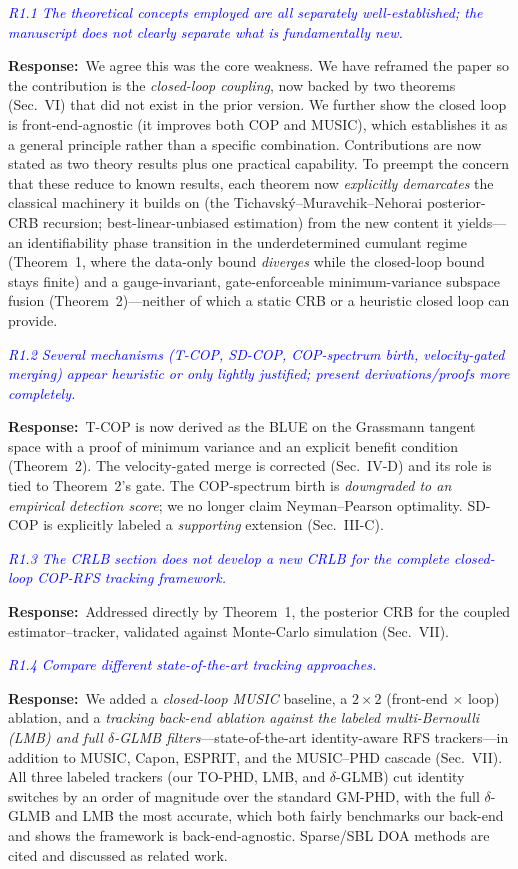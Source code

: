 \documentclass[11pt]{article}
\newcommand{\rc}[1]{\textit{\textcolor{blue}{#1}}}      %
\newcommand{\reply}{\par\noindent\textbf{Response:}\ }
\begin{document}
\rc{R1.1 The theoretical concepts employed are all separately well-established;
the manuscript does not clearly separate what is fundamentally new.}
\reply We agree this was the core weakness. We have reframed the paper so the
contribution is the \emph{closed-loop coupling}, now backed by two theorems
(Sec.~VI) that did not exist in the prior version. We further show the closed loop
is front-end-agnostic (it improves both COP and MUSIC), which establishes it as a
general principle rather than a specific combination. Contributions are now
stated as two theory results plus one practical capability. To preempt the
concern that these reduce to known results, each theorem now \emph{explicitly
demarcates} the classical machinery it builds on (the
Tichavsk\'y--Muravchik--Nehorai posterior-CRB recursion; best-linear-unbiased
estimation) from the new content it yields---an identifiability phase transition
in the underdetermined cumulant regime (Theorem~1, where the data-only bound
\emph{diverges} while the closed-loop bound stays finite) and a gauge-invariant,
gate-enforceable minimum-variance subspace fusion (Theorem~2)---neither of which a
static CRB or a heuristic closed loop can provide.

\rc{R1.2 Several mechanisms (T-COP, SD-COP, COP-spectrum birth, velocity-gated
merging) appear heuristic or only lightly justified; present derivations/proofs
more completely.}
\reply T-COP is now derived as the BLUE on the Grassmann tangent space with a
proof of minimum variance and an explicit benefit condition (Theorem~2). The
velocity-gated merge is corrected (Sec.~IV-D) and its role is tied to Theorem~2's
gate. The COP-spectrum birth is \emph{downgraded to an empirical detection
score}; we no longer claim Neyman--Pearson optimality. SD-COP is explicitly
labeled a \emph{supporting} extension (Sec.~III-C).

\rc{R1.3 The CRLB section does not develop a new CRLB for the complete
closed-loop COP-RFS tracking framework.}
\reply Addressed directly by Theorem~1, the posterior CRB for the coupled
estimator--tracker, validated against Monte-Carlo simulation (Sec.~VII).

\rc{R1.4 Compare different state-of-the-art tracking approaches.}
\reply We added a \emph{closed-loop MUSIC} baseline, a $2\times2$ (front-end
$\times$ loop) ablation, and a \emph{tracking back-end ablation against the
labeled multi-Bernoulli (LMB) and full $\delta$-GLMB filters}---state-of-the-art
identity-aware RFS trackers---in addition to MUSIC, Capon, ESPRIT, and the
MUSIC--PHD cascade (Sec.~VII). All three labeled trackers (our TO-PHD, LMB, and
$\delta$-GLMB) cut identity switches by an order of magnitude over the standard
GM-PHD, with the full $\delta$-GLMB and LMB the most accurate, which both
fairly benchmarks our back-end and shows the framework is back-end-agnostic.
Sparse/SBL DOA methods are cited and discussed as related work.
\end{document}

